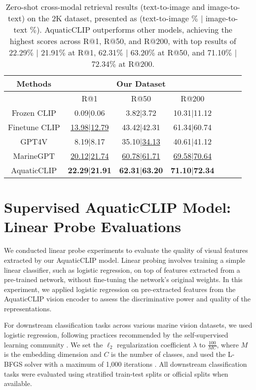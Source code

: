\begin{table}[t!]
\centering
\caption{Zero-shot cross-modal retrieval results (text-to-image and image-to-text) on the 2K dataset, presented as (text-to-image $\%$ $|$ image-to-text $\%$).
AquaticCLIP outperforms other models, achieving the highest scores across R$@$1, R$@$50, and R$@$200, with top results of 22.29$\%$ $|$ 21.91$\%$ at R@1, 62.31$\%$ $|$ 63.20$\%$ at R@50, and 71.10$\%$ $|$ 72.34$\%$ at R@200.}
\begin{tabular}{|c | c| c| c| c| c| c|}
\hline
Methods & \multicolumn{3}{c|}{Our Dataset}  \\ \hline
& R@1 & R@50 &R@200 \\
Frozen CLIP&0.09$|$0.06&3.82$|$3.72&10.31$|$11.12\\
Finetune CLIP&\underline{13.98}$|$\underline{12.79}&43.42$|$42.31&61.34$|$60.74\\
GPT4V&8.19$|$8.17&35.10$|$\underline{34.13}&40.61$|$41.12\\
MarineGPT&\underline{20.12}$|$\underline{21.74}&\underline{60.78}$|$\underline{61.71}&\underline{69.58}$|$\underline{70.64}\\
AquaticCLIP&\textbf{22.29}$|$\textbf{21.91}&\textbf{62.31}$|$\textbf{63.20}&\textbf{71.10}$|$\textbf{72.34}\\
\hline
\end{tabular}
\label{table4}
\end{table}


\section{Supervised AquaticCLIP Model: Linear Probe Evaluations}
\label{supervised}
We conducted linear probe experiments to evaluate the quality of visual features extracted by our AquaticCLIP model. 
Linear probing involves training a simple linear classifier, such as logistic regression, on top of features extracted from a pre-trained network, without fine-tuning the network’s original weights. 
In this experiment, we applied logistic regression on pre-extracted features from the AquaticCLIP vision encoder to assess the discriminative power and quality of the representations.

For downstream classification tasks across various marine vision datasets, we used logistic regression, following practices recommended by the self-supervised learning community \cite{geiping2023cookbook, caron2021emerging}.
We set the $\ell_{2}$ regularization coefficient $\lambda$ to $\frac{100}{MC}$, where $M$ is the embedding dimension and $C$ is the number of classes, and used the L-BFGS solver with a maximum of 1,000 iterations \cite{zhu1997algorithm}.
All downstream classification tasks were evaluated using stratified train-test splits or official splits when available.


